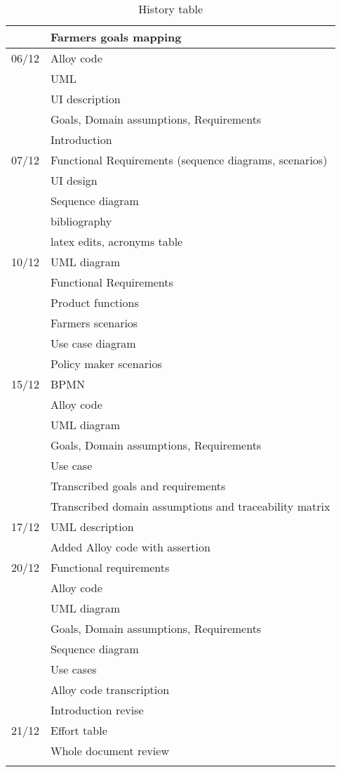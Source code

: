 \begin{center}
\begin{longtable}{ll}
        	&	Farmers goals mapping\\
        \hline
        06/12	&	Alloy code	\\
        	&	UML	\\
        	&	UI description	\\
        	&	Goals, Domain assumptions, Requirements		\\
        	&	Introduction	\\
        \hline
        07/12	&	Functional Requirements (sequence diagrams, scenarios)\\
        	&	UI design\\
        	&	Sequence diagram	\\
        	&	bibliography\\
        	&	latex edits, acronyms table	\\
        \hline
        10/12	&	UML diagram	\\
        	&	Functional Requirements \\
        	&	Product functions\\
        	&	Farmers scenarios	\\
        	&	Use case diagram	\\
        	&	Policy maker scenarios	\\
        \hline
        15/12	&	BPMN\\
        	&	Alloy code	\\
        	&	UML diagram		\\
        	&	Goals, Domain assumptions, Requirements		\\
        	&	Use case	\\
        	&	Transcribed goals and requirements\\
     	    &	Transcribed domain assumptions and traceability matrix  \\
        \hline
        17/12	&	UML description	\\
        	&	Added Alloy code with assertion		\\
        \hline
        20/12	&	Functional requirements	\\
        	&	Alloy code	\\
        	&	UML diagram		\\
        	&	Goals, Domain assumptions, Requirements\\
        	&	Sequence diagram	\\
        	&	Use cases	\\
        	&	Alloy code transcription	\\
        	&	Introduction revise		\\
        \hline
        21/12 & Effort table \\
         & Whole document review \\
        \hline
        
        \rowcolor{white}\caption{\label{tab:history}History table}
        
    \end{longtable}
\end{center}
